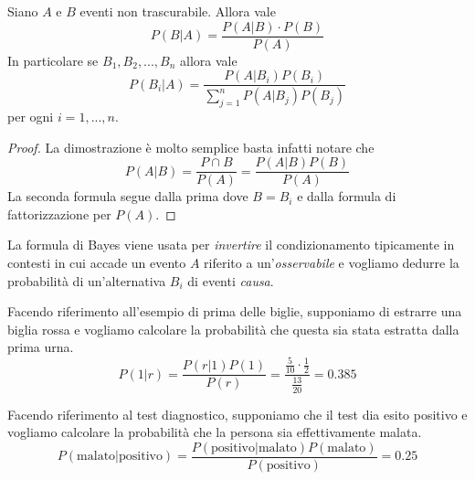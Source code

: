 \begin{theorem}[Bayes]\label{th: bayes}
	Siano $A$ e $B$ eventi non trascurabile. Allora vale
	\[ P(B | A) = \frac{P(A | B) \cdot P(B)}{P(A)} \]
	In particolare se $B_1, B_2, ..., B_n$ allora vale 
	\[ P(B_i | A) = \frac{P(A | B_i) P(B_i)}{\sum_{j=1}^n P(A | B_j) P(B_j)} \]
	per ogni $i = 1, ..., n$.
	\begin{proof}
		La dimostrazione è molto semplice basta infatti notare che 
		\[ P(A | B) = \frac{P \cap B}{P(A)} = \frac{P(A | B) P(B)}{P(A)} \]
		La seconda formula segue dalla prima dove $B=B_i$ e dalla formula di fattorizzazione
		per $P(A)$.
	\end{proof}
\end{theorem}

La formula di Bayes viene usata per \emph{invertire} il condizionamento tipicamente in contesti
in cui accade un evento $A$ riferito a un'\emph{osservabile} e vogliamo dedurre la probabilità di
un'alternativa $B_i$ di eventi \emph{causa}.

\begin{example}
	Facendo riferimento all'esempio di prima delle biglie, supponiamo di estrarre una biglia
	rossa e vogliamo calcolare la probabilità che questa sia stata estratta dalla prima urna.
	\[
		P(1 | r) = \frac{P(r | 1) P(1)}{P(r)} = 
		\frac{\frac{5}{10} \cdot \frac{1}{2}}{\frac{13}{20}} = 0.385
	\]
\end{example}

\begin{example}
	Facendo riferimento al test diagnostico, supponiamo che il test dia esito positivo e vogliamo
	calcolare la probabilità che la persona sia effettivamente malata.
	\[
		P(\text{malato} | \text{positivo}) = 
		\frac{P(\text{positivo} | \text{malato}) P(\text{malato})}{P(\text{positivo})} = 0.25
	\]
\end{example}
